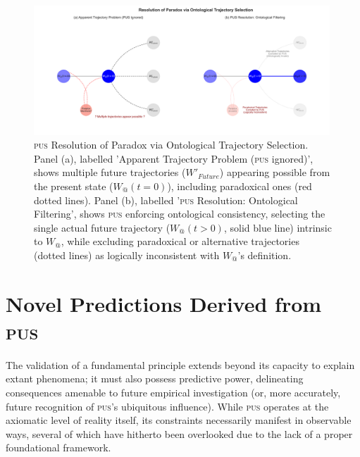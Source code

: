 \documentclass[11pt, a4paper]{article}
\makeatletter
\newcommand{\pus}{\textsc{pus}} %
\newcommand{\Wactual}{W_{@}} %
\makeatother
\begin{document}
\FloatBarrier


\begin{figure}[htbp]
    \centering
    \includegraphics[width=0.99\textwidth]{figures/pus_figure3_paradox_paths.png} %
    \caption{\pus{} Resolution of Paradox via Ontological Trajectory Selection. Panel (a), labelled 'Apparent Trajectory Problem (\pus{} ignored)', shows multiple future trajectories ($W'_{Future}$) appearing possible from the present state ($W_{@}(t=0)$), including paradoxical ones (red dotted lines). Panel (b), labelled '\pus{} Resolution: Ontological Filtering', shows \pus{} enforcing ontological consistency, selecting the single actual future trajectory ($W_{@}(t>0)$, solid blue line) intrinsic to $\Wactual$, while excluding paradoxical or alternative trajectories (dotted lines) as logically inconsistent with $\Wactual$'s definition.}
    \label{fig:paradox}
\end{figure}
\FloatBarrier 

\section{Novel Predictions Derived from \pus}
The validation of a fundamental principle extends beyond its capacity to explain extant phenomena; it must also possess predictive power, delineating consequences amenable to future empirical investigation (or, more accurately, future recognition of \pus's ubiquitous influence). While \pus{} operates at the axiomatic level of reality itself, its constraints necessarily manifest in observable ways, several of which have hitherto been overlooked due to the lack of a proper foundational framework.
\end{document}
